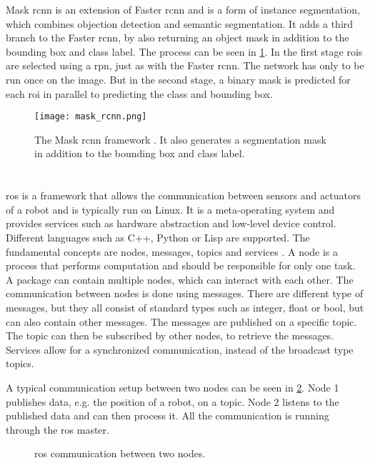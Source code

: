 Mask \gls{rcnn} \cite{He2017} is an extension of Faster \gls{rcnn} and is a form of instance segmentation, which combines objection detection and semantic segmentation.
It adds a third branch to the Faster \gls{rcnn}, by also returning an object mask in addition to the bounding box and class label.
The process can be seen in \cref{fig:mask_rcnn}.
In the first stage \glspl{roi} are selected using a \gls{rpn}, just as with the Faster \gls{rcnn}.
The network has only to be run once on the image.
But in the second stage, a binary mask is predicted for each \gls{roi} in parallel to predicting the class and bounding box.
\begin{figure}[htbp]
	\centering
	\texttt{[image: mask\_rcnn.png]}
	\caption[Mask \acrshort{rcnn} framework]{The Mask \acrshort{rcnn} framework \cite{He2017}. It also generates a segmentation mask in addition to the bounding box and class label.}
	\label{fig:mask_rcnn}
\end{figure}



\section{}
\label{sec:ros}
\acrfull{ros} is a framework that allows the communication between sensors and actuators of a robot and is typically run on Linux.
It is a meta-operating system and provides services such as hardware abstraction and low-level device control.
Different languages such as C++, Python or Lisp are supported.
The fundamental concepts are nodes, messages, topics and services \cite{Quigley2009}.
A node is a process that performs computation and should be responsible for only one task.
A package can contain multiple nodes, which can interact with each other.
The communication between nodes is done using messages.
There are different type of messages, but they all consist of standard types such as integer, float or bool, but can also contain other messages.
The messages are published on a specific topic.
The topic can then be subscribed by other nodes, to retrieve the messages.
Services allow for a synchronized communication, instead of the broadcast type topics.\par
A typical communication setup between two nodes can be seen in \cref{fig:ros_framework}.
Node 1 publishes data, e.g. the position of a robot, on a topic.
Node 2 listens to the published data and can then process it.
All the communication is running through the \gls{ros} master.
\begin{figure}[htb]
	\centering
	
	\caption[\acrshort{ros} communication]{\acrshort{ros} communication between two nodes.}
	\label{fig:ros_framework}
\end{figure}